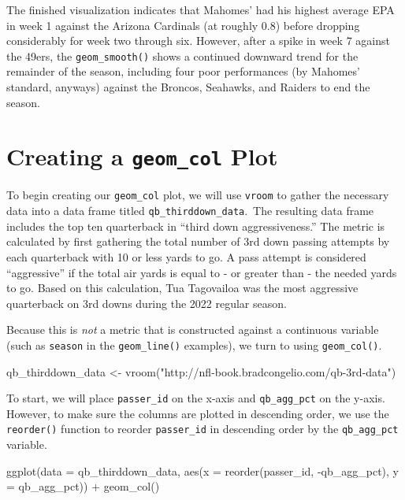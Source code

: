 \documentclass[
  letterpaper,
]{krantz}
\newenvironment{Shaded}{\begin{snugshade}}{\end{snugshade}}
\newcommand{\AttributeTok}[1]{\textcolor[rgb]{0.40,0.45,0.13}{#1}}
\newcommand{\FunctionTok}[1]{\textcolor[rgb]{0.28,0.35,0.67}{#1}}
\newcommand{\NormalTok}[1]{\textcolor[rgb]{0.00,0.23,0.31}{#1}}
\newcommand{\OtherTok}[1]{\textcolor[rgb]{0.00,0.23,0.31}{#1}}
\newcommand{\SpecialCharTok}[1]{\textcolor[rgb]{0.37,0.37,0.37}{#1}}
\newcommand{\StringTok}[1]{\textcolor[rgb]{0.13,0.47,0.30}{#1}}
\begin{document}
The finished visualization indicates that Mahomes' had his highest
average EPA in week 1 against the Arizona Cardinals (at roughly 0.8)
before dropping considerably for week two through six. However, after a
spike in week 7 against the 49ers, the \texttt{geom\_smooth()} shows a
continued downward trend for the remainder of the season, including four
poor performances (by Mahomes' standard, anyways) against the Broncos,
Seahawks, and Raiders to end the season.

\hypertarget{creating-a-geom_col-plot}{%
\section{\texorpdfstring{Creating a \texttt{geom\_col}
Plot}{Creating a geom\_col Plot}}\label{creating-a-geom_col-plot}}

To begin creating our \texttt{geom\_col} plot, we will use
\texttt{vroom} to gather the necessary data into a data frame titled
\texttt{qb\_thirddown\_data}.~The resulting data frame includes the top
ten quarterback in ``third down aggressiveness.'' The metric is
calculated by first gathering the total number of 3rd down passing
attempts by each quarterback with 10 or less yards to go. A pass attempt
is considered ``aggressive'' if the total air yards is equal to - or
greater than - the needed yards to go. Based on this calculation, Tua
Tagovailoa was the most aggressive quarterback on 3rd downs during the
2022 regular season.

Because this is \emph{not} a metric that is constructed against a
continuous variable (such as \texttt{season} in the
\texttt{geom\_line()} examples), we turn to using \texttt{geom\_col()}.

\begin{Shaded}
\begin{Highlighting}[]
\NormalTok{qb\_thirddown\_data }\OtherTok{\textless{}{-}} \FunctionTok{vroom}\NormalTok{(}\StringTok{"http://nfl{-}book.bradcongelio.com/qb{-}3rd{-}data"}\NormalTok{)}
\end{Highlighting}
\end{Shaded}

To start, we will place \texttt{passer\_id} on the x-axis and
\texttt{qb\_agg\_pct} on the y-axis. However, to make sure the columns
are plotted in descending order, we use the \texttt{reorder()} function
to reorder \texttt{passer\_id} in descending order by the
\texttt{qb\_agg\_pct} variable.

\begin{Shaded}
\begin{Highlighting}[]
\FunctionTok{ggplot}\NormalTok{(}\AttributeTok{data =}\NormalTok{ qb\_thirddown\_data, }\FunctionTok{aes}\NormalTok{(}\AttributeTok{x =} \FunctionTok{reorder}\NormalTok{(passer\_id, }\SpecialCharTok{{-}}\NormalTok{qb\_agg\_pct), }\AttributeTok{y =}\NormalTok{ qb\_agg\_pct)) }\SpecialCharTok{+}
  \FunctionTok{geom\_col}\NormalTok{()}
\end{Highlighting}
\end{Shaded}
\end{document}
